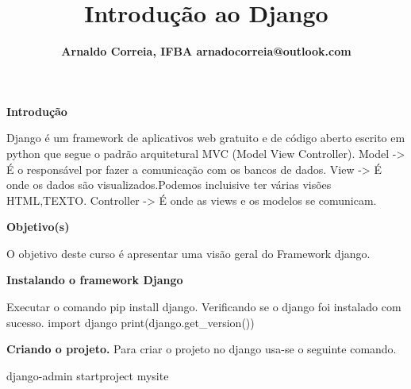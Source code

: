 \documentclass[18pt]{beamer}
\title[]{
{\fontsize{28pt}{30}\selectfont\textbf{Introdução ao Django}}}
\author{
{\fontsize{18pt}{20}\selectfont \textbf{
Arnaldo Correia, IFBA  arnadocorreia@outlook.com
}}}
\begin{document}
{\logotitle
\begin{frame}
\maketitle
\end{frame}
}



\begin{frame}{\fontsize{20pt}{20}\selectfont \textbf{Introdução}}

  Django é um framework de aplicativos web gratuito e de código aberto escrito em python
  que segue o padrão arquitetural MVC (Model View Controller).
  \newline
  Model -> É o responsável por fazer a comunicação com os bancos de dados.
  \newline
  View -> É onde os dados são visualizados.Podemos incluisive ter várias visões HTML,TEXTO.
  \newline
  Controller -> É onde as views e os modelos se comunicam.

\end{frame}



\begin{frame}{\fontsize{20pt}{20}\selectfont \textbf{Objetivo(s)}}

O objetivo deste curso é apresentar uma visão geral do Framework django.

\end{frame}


\begin{frame}{\fontsize{20pt}{20}\selectfont \textbf{Instalando o framework Django}}

  Executar o comando pip install django.
  Verificando se o django foi instalado com sucesso.
  import django
  print(django.get\_version())
  

\end{frame}


\begin{frame}{\fontsize{20pt}{20}\selectfont \textbf{Criando o projeto.}}
  Para criar o projeto no django usa-se o seguinte comando.

  django-admin startproject  mysite

\end{frame}
\end{document}
